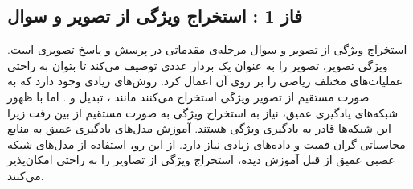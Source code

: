 \subsection{فاز 1 : استخراج ویژگی از تصویر و سوال} \label{sec:extract}

		استخراج ویژگی از تصویر و سوال مرحله‌ی مقدماتی در پرسش و پاسخ تصویری است. ویژگی تصویر، تصویر را به عنوان یک بردار عددی  توصیف می‌کند تا بتوان به راحتی عملیات‌های مختلف ریاضی را بر روی آن اعمال کرد. روش‌های زیادی وجود دارد که به صورت مستقیم از تصویر ویژگی استخراج می‌کنند مانند 
		، تبدیل
		و 
		.
		اما با ظهور شبکه‌های یادگیری عمیق، نیاز به استخراج ویژگی به صورت مستقیم از بین رفت زیرا این شبکه‌ها قادر به یادگیری ویژگی هستند. آموزش مدل‌های یادگیری عمیق به منابع محاسباتی گران قمیت و ‌داده‌های زیادی نیاز دارد. از این رو، استفاده از مدل‌های شبکه عصبی عمیق از قبل آموزش دیده، استخراج ویژگی‌ از تصاویر را به راحتی امکان‌پذیر می‌کنند. 
		
